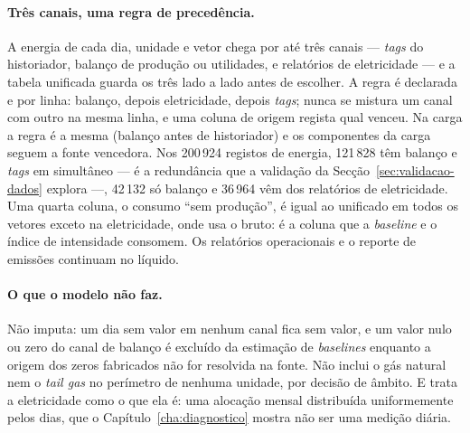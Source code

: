 \paragraph{Três canais, uma regra de precedência.} A energia de cada
dia, unidade e vetor chega por até três canais --- \emph{tags} do
historiador, balanço de produção ou utilidades, e relatórios de
eletricidade --- e a tabela unificada guarda os três lado a lado antes de
escolher. A regra é declarada e por linha: balanço, depois eletricidade,
depois \emph{tags}; nunca se mistura um canal com outro na mesma linha, e
uma coluna de origem regista qual venceu. Na carga a regra é a mesma
(balanço antes de historiador) e os componentes da carga seguem a fonte
vencedora. Nos 200\,924 registos de energia, 121\,828 têm balanço e
\emph{tags} em simultâneo --- é a redundância que a validação da
Secção~\ref{sec:validacao-dados} explora ---, 42\,132 só balanço e 36\,964
vêm dos relatórios de eletricidade. Uma quarta coluna, o consumo ``sem
produção'', é igual ao unificado em todos os vetores exceto na
eletricidade, onde usa o bruto: é a coluna que a \emph{baseline} e o índice
de intensidade consomem. Os relatórios operacionais e o reporte de
emissões continuam no líquido.

\paragraph{O que o modelo não faz.} Não imputa: um dia sem valor em nenhum
canal fica sem valor, e um valor nulo ou zero do canal de balanço é
excluído da estimação de \emph{baselines} enquanto a origem dos zeros
fabricados não for resolvida na fonte. Não inclui o gás natural nem o
\emph{tail gas} no perímetro de nenhuma unidade, por decisão de âmbito.
E trata a eletricidade como o que ela é: uma alocação mensal distribuída
uniformemente pelos dias, que o Capítulo~\ref{cha:diagnostico} mostra não
ser uma medição diária.

